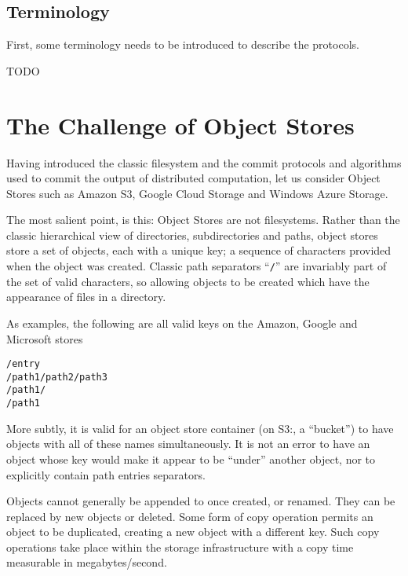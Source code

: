 \documentclass[manuscript]{acmart}
\begin{document}
\subsection{Terminology}\label{subsec:terminology}

First, some terminology needs to be introduced to describe
the protocols.

TODO



\section{The Challenge of Object Stores}
\label{sec:object-stores}

Having introduced the classic filesystem and the commit protocols and algorithms
used to commit the output of distributed computation, let us consider
Object Stores such as Amazon S3, Google Cloud Storage and
Windows Azure Storage.



The most salient point, is this: Object Stores are not filesystems.
Rather than the classic hierarchical view of directories, subdirectories
and paths, object stores store a set of objects, each with a unique key;
a sequence of characters provided when the object was created.
Classic path separators ``\texttt{/}'' are invariably part of the set of valid
characters, so allowing objects to be created which have the appearance
of files in a directory.

As examples, the following are all valid keys on the Amazon, Google and Microsoft
stores

\begin{verbatim}
/entry
/path1/path2/path3
/path1/
/path1
\end{verbatim}

More subtly, it is valid for an object store container (on S3:, a ``bucket'')
to have objects with all of these names simultaneously.
It is not an error to have an object whose key would make it appear to be
``under'' another object, nor to explicitly contain path entries separators.

Objects cannot generally be appended to once created, or renamed.
They can be replaced by new objects or deleted.
Some form of copy operation permits an object to be duplicated, creating
a new object with a different key.
Such copy operations take place within the storage infrastructure with a
copy time measurable in megabytes/second.
\end{document}
